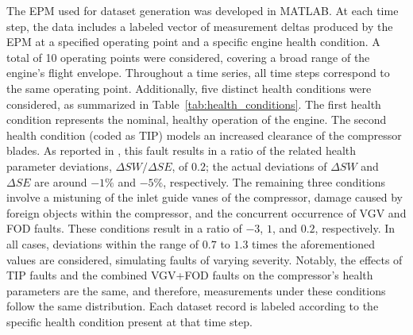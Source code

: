 \documentclass{ecai}
\begin{document}
The EPM used for dataset generation was developed in MATLAB. At each time step, the data includes a labeled vector of measurement deltas produced by the EPM at a specified operating point and a specific engine health condition. A total of 10 operating points were considered, covering a broad range of the engine’s flight envelope. Throughout a time series, all time steps correspond to the same operating point. Additionally, five distinct health conditions were considered, as summarized in Table~\ref{tab:health_conditions}. The first health condition represents the nominal, healthy operation of the engine. The second health condition (coded as TIP) models an increased clearance of the compressor blades. As reported in \citep{mathioudakis_signatures_2024}, this fault results in a ratio of the related health parameter deviations, $\Delta SW/\Delta SE$, of $0.2$; the actual deviations of $\Delta SW$ and $\Delta SE$ are around $-1\%$ and $-5\%$, respectively. The remaining three conditions involve a mistuning of the inlet guide vanes of the compressor, damage caused by foreign objects within the compressor, and the concurrent occurrence of VGV and FOD faults. These conditions result in a ratio of $-3$, $1$, and $0.2$, respectively. In all cases, deviations within the range of $0.7$ to $1.3$ times the aforementioned values are considered, simulating faults of varying severity. Notably, the effects of TIP faults and the combined VGV+FOD faults on the compressor’s health parameters are the same, and therefore, measurements under these conditions follow the same distribution. Each dataset record is labeled according to the specific health condition present at that time step.



\end{document}

